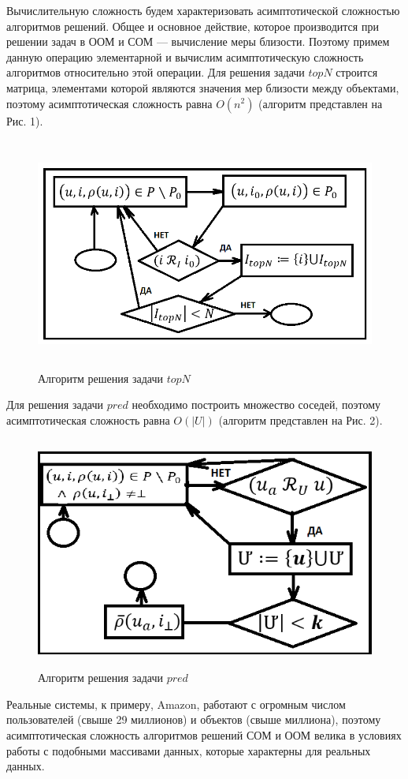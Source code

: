 Вычислительную сложность будем характеризовать асимптотической сложностью
алгоритмов решений. Общее и основное действие, которое производится при
решении задач в ООМ и СОМ
--- вычисление меры близости. Поэтому примем данную операцию элементарной
и вычислим асимптотическую сложность алгоритмов относительно этой операции.
Для решения задачи $topN$ строится матрица, элементами которой являются
значения мер близости между объектами, поэтому
асимптотическая сложность равна $O(n^2)$ (алгоритм представлен на Рис. 1).
\begin{figure}[H]
	\caption{Алгоритм решения задачи $topN$}
	\begin{center}
		\includegraphics[width=5in,height=3in]{pics/oom_topN.png}
	\end{center}
\end{figure}
Для решения задачи $pred$ необходимо построить множество соседей,
поэтому асимптотическая сложность равна $O(|U|)$ (алгоритм представлен на Рис. 2).
\begin{figure}[H]
	\caption{Алгоритм решения задачи $pred$}
	\begin{center}
		\includegraphics[width=5.5in,height=3in]{pics/prdn-com.png}
	\end{center}
\end{figure}
Реальные системы, к примеру, Amazon, работают с огромным числом пользователей
(свыше 29 миллионов) и объектов (свыше миллиона), поэтому
асимптотическая сложность алгоритмов решений СОМ и ООМ велика в условиях работы
с подобными массивами данных, которые характерны для реальных данных.

